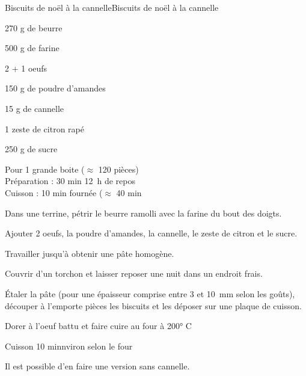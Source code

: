 \begin{recette}{Biscuits de noël à la cannelle}{Biscuits de noël à la cannelle}

\begin{ingredients}
270 g de beurre\par
500 g de farine\par
2 + 1 oeufs\par
150 g de poudre d'amandes\par
15 g de cannelle\par
1 zeste de citron rapé\par
250 g de sucre\par
\end{ingredients}

\begin{infos}
Pour 1 grande boite ($\approx$ 120 pièces)\\
Préparation : 30 min 12~h de repos\\
Cuisson : 10 min fournée  ($\approx$ 40 min\\
\end{infos}

\begin{etapes}
\item Dans une terrine, pétrir le beurre ramolli avec la farine du bout des doigts.
\item Ajouter 2 oeufs, la poudre d'amandes, la cannelle, le zeste de citron et le sucre.
\item Travailler jusqu'à obtenir une pâte homogène.
\item Couvrir d'un torchon et laisser reposer une nuit dans un endroit frais.
\item Étaler la pâte (pour une épaisseur comprise entre 3 et 10~mm selon les goûts), découper à l'emporte pièces les biscuits et les déposer sur une plaque de cuisson.
\item Dorer à l'oeuf battu et faire cuire au four à 200° C
\item Cuisson 10 minnviron selon le four
\end{etapes}

\begin{conseils}
Il est possible d'en faire une version sans cannelle.
\end{conseils}

\end{recette}